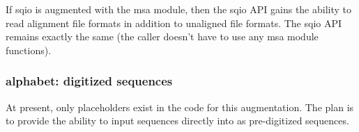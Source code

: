 If sqio is augmented with the msa module, then the sqio API gains the
ability to read alignment file formats in addition to unaligned file
formats. The sqio API remains exactly the same (the caller doesn't
have to use any msa module functions).

\subsubsection{alphabet: digitized sequences}

At present, only placeholders exist in the code for this augmentation.
The plan is to provide the ability to input sequences directly into
 as pre-digitized sequences.






